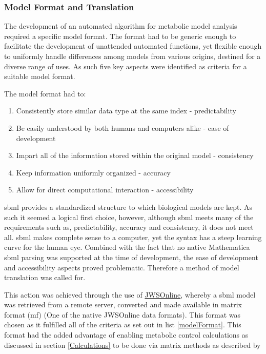 \subsubsection{Model Format and Translation} \label{Translation}
The development of an automated algorithm for metabolic model analysis required a specific model format. The format had to be generic enough to facilitate the development of unattended automated functions, yet flexible enough to uniformly handle differences among models from various origins, destined for a diverse range of uses. As such five key aspects were identified as criteria for a suitable model format.

The model format had to: 
\begin{enumerate} \label{modelFormat}
  \item Consistently store similar data type at the same index - predictability
  \item Be easily understood by both humans and computers alike - ease of development
  \item Impart all of the information stored within the original model - consistency
  \item Keep information uniformly organized - accuracy
  \item Allow for direct computational interaction - accessibility
\end{enumerate}

\gls{sbml} provides a standardized structure to which biological models are kept. As such it seemed a logical first choice, however, although \gls{sbml} meets many of the requirements such as, predictability, accuracy and consistency, it does not meet all. \gls{sbml} makes complete sense to a computer, yet the syntax has a steep learning curve for the human eye. Combined with the fact that no native Mathematica \gls{sbml} parsing was supported at the time of development, the ease of development and accessibility aspects proved problematic. Therefore a method of model translation was called for. 

This action was achieved through the use of \href{https://jjj.bio.vu.nl}{JWSOnline}, whereby a \gls{sbml} model was retrieved from a remote server, converted and made available in matrix format (\gls{mf}) (One of the native JWSOnline data formats). This format was chosen as it fulfilled all of the criteria as set out in list \ref{modelFormat}. This format had the added advantage of enabling metabolic control calculations as discussed in section \ref{Calculations} to be done via matrix methods as described by \citeauthor{Hofmeyr2001}

